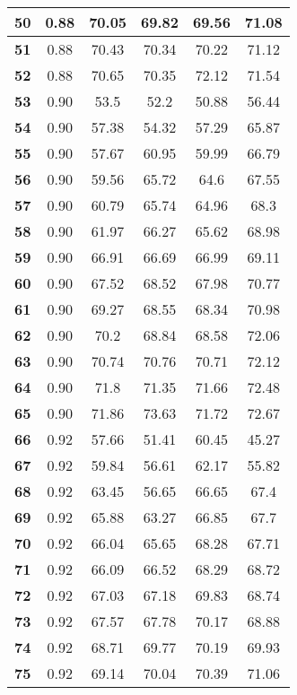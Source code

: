\begin{longtable}{|c|c|c|c|c|c|}
\textbf{50} & 0.88 & 70.05 & 69.82 & 69.56 & 71.08 \\ \hline 
\textbf{51} & 0.88 & 70.43 & 70.34 & 70.22 & 71.12 \\ \hline 
\textbf{52} & 0.88 & 70.65 & 70.35 & 72.12 & 71.54 \\ \hline 
\textbf{53} & 0.90 & 53.5 & 52.2 & 50.88 & 56.44 \\ \hline 
\textbf{54} & 0.90 & 57.38 & 54.32 & 57.29 & 65.87 \\ \hline 
\textbf{55} & 0.90 & 57.67 & 60.95 & 59.99 & 66.79 \\ \hline 
\textbf{56} & 0.90 & 59.56 & 65.72 & 64.6 & 67.55 \\ \hline 
\textbf{57} & 0.90 & 60.79 & 65.74 & 64.96 & 68.3 \\ \hline 
\textbf{58} & 0.90 & 61.97 & 66.27 & 65.62 & 68.98 \\ \hline 
\textbf{59} & 0.90 & 66.91 & 66.69 & 66.99 & 69.11 \\ \hline 
\textbf{60} & 0.90 & 67.52 & 68.52 & 67.98 & 70.77 \\ \hline 
\textbf{61} & 0.90 & 69.27 & 68.55 & 68.34 & 70.98 \\ \hline 
\textbf{62} & 0.90 & 70.2 & 68.84 & 68.58 & 72.06 \\ \hline 
\textbf{63} & 0.90 & 70.74 & 70.76 & 70.71 & 72.12 \\ \hline 
\textbf{64} & 0.90 & 71.8 & 71.35 & 71.66 & 72.48 \\ \hline 
\textbf{65} & 0.90 & 71.86 & 73.63 & 71.72 & 72.67 \\ \hline 
\textbf{66} & 0.92 & 57.66 & 51.41 & 60.45 & 45.27 \\ \hline 
\textbf{67} & 0.92 & 59.84 & 56.61 & 62.17 & 55.82 \\ \hline 
\textbf{68} & 0.92 & 63.45 & 56.65 & 66.65 & 67.4 \\ \hline 
\textbf{69} & 0.92 & 65.88 & 63.27 & 66.85 & 67.7 \\ \hline 
\textbf{70} & 0.92 & 66.04 & 65.65 & 68.28 & 67.71 \\ \hline 
\textbf{71} & 0.92 & 66.09 & 66.52 & 68.29 & 68.72 \\ \hline 
\textbf{72} & 0.92 & 67.03 & 67.18 & 69.83 & 68.74 \\ \hline 
\textbf{73} & 0.92 & 67.57 & 67.78 & 70.17 & 68.88 \\ \hline 
\textbf{74} & 0.92 & 68.71 & 69.77 & 70.19 & 69.93 \\ \hline 
\textbf{75} & 0.92 & 69.14 & 70.04 & 70.39 & 71.06 \\ \hline 

\end{longtable}
